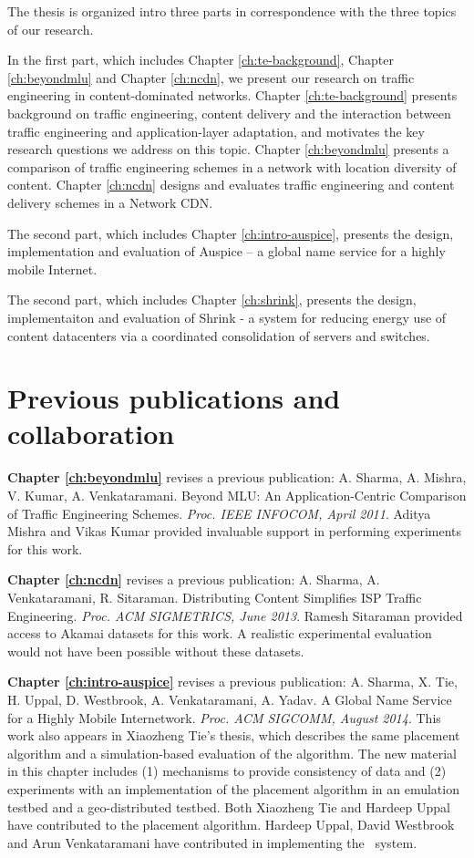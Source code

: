 The thesis is organized intro three parts in correspondence with the three topics of our research.

In the first part, which includes Chapter \ref{ch:te-background}, Chapter \ref{ch:beyondmlu} and Chapter \ref{ch:ncdn}, we present our research on traffic engineering in content-dominated networks. Chapter \ref{ch:te-background} presents background on traffic engineering, content delivery and the interaction between traffic engineering and application-layer adaptation, and motivates the key research questions we address on this topic. Chapter \ref{ch:beyondmlu} presents a comparison of traffic engineering schemes in a network with location diversity of content. Chapter \ref{ch:ncdn} designs and evaluates traffic engineering and content delivery schemes in a Network CDN.

The second part, which includes Chapter \ref{ch:intro-auspice}, presents the design, implementation and evaluation of Auspice -- a global name service for a highly mobile Internet.

The second part, which includes Chapter \ref{ch:shrink}, presents the design, implementaiton and evaluation of Shrink - a system for reducing energy use of content datacenters via a coordinated consolidation of servers and switches.

\section{Previous publications and collaboration}

\textbf{Chapter \ref{ch:beyondmlu}} revises a previous publication: A. Sharma, A. Mishra, V. Kumar, A. Venkataramani. Beyond MLU: An Application-Centric Comparison of Traffic Engineering Schemes. \emph{Proc. IEEE INFOCOM, April 2011}. Aditya Mishra and Vikas Kumar provided invaluable support in performing experiments for this work.

\textbf{Chapter \ref{ch:ncdn}} revises a previous publication: A. Sharma, A. Venkataramani, R. Sitaraman. Distributing Content Simplifies ISP Traffic Engineering. \emph{Proc. ACM SIGMETRICS, June 2013}. Ramesh Sitaraman provided access to Akamai datasets for this work. A realistic experimental evaluation would not have been possible without these datasets.

\textbf{Chapter \ref{ch:intro-auspice}} revises a previous publication: A. Sharma, X. Tie, H. Uppal, D. Westbrook, A. Venkataramani, A. Yadav. A Global Name Service for a Highly Mobile Internetwork. \emph{Proc. ACM SIGCOMM, August 2014}. 
This work also appears in Xiaozheng Tie's thesis, which describes the same placement algorithm and a simulation-based evaluation of the algorithm. The new material in this chapter includes (1) mechanisms to provide consistency of data and (2) experiments with an implementation of the placement algorithm in an emulation testbed and a geo-distributed testbed. Both Xiaozheng Tie and Hardeep Uppal have contributed to the placement algorithm. Hardeep Uppal, David Westbrook and Arun Venkataramani have contributed in implementing the \auspice\ system.

